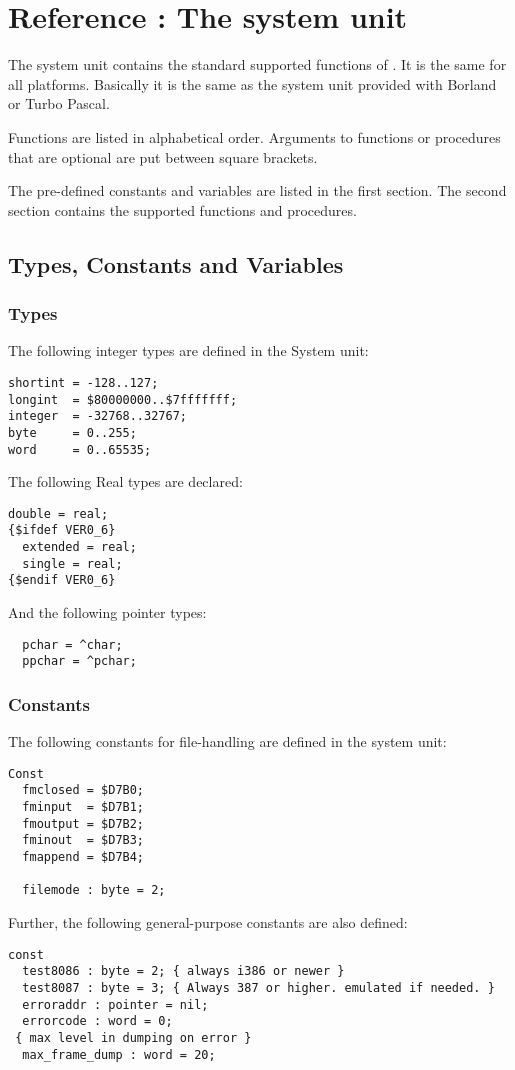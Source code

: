 \documentclass{report}
\begin{document}
%
%

\chapter{Reference : The system unit}
The system unit contains the standard supported functions of \fpc. It is the
same for all platforms. Basically it is the same as the system unit provided
with Borland or Turbo Pascal. 

Functions are listed in alphabetical order.
Arguments to functions or procedures that are optional are put between
square brackets.

The pre-defined constants and variables are listed in the first section. The
second section contains the supported functions and procedures.
\section{Types, Constants and Variables}
\subsection{Types}
The following integer types are defined in the System unit:
\begin{verbatim}
shortint = -128..127;
longint  = $80000000..$7fffffff;
integer  = -32768..32767;
byte     = 0..255;
word     = 0..65535;
\end{verbatim}

The following Real types are declared: 
\begin{verbatim}
double = real;
{$ifdef VER0_6}
  extended = real;
  single = real;
{$endif VER0_6}
\end{verbatim}

And the following pointer types:
\begin{verbatim}
  pchar = ^char;
  ppchar = ^pchar;
\end{verbatim}

\subsection{Constants}
The following constants for file-handling are defined in the system unit:
\begin{verbatim}
Const
  fmclosed = $D7B0;
  fminput  = $D7B1;
  fmoutput = $D7B2;
  fminout  = $D7B3;
  fmappend = $D7B4;

  filemode : byte = 2;
\end{verbatim}
Further, the following general-purpose constants are also defined:
\begin{verbatim} 
const
  test8086 : byte = 2; { always i386 or newer }
  test8087 : byte = 3; { Always 387 or higher. emulated if needed. }
  erroraddr : pointer = nil;
  errorcode : word = 0;
 { max level in dumping on error }
  max_frame_dump : word = 20;
\end{verbatim}
\end{document}
